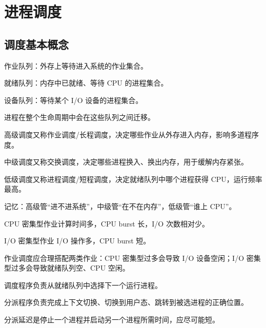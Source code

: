 \chapter{进程调度}

\section{调度基本概念}
\begin{points}
  \item 作业队列：外存上等待进入系统的作业集合。
  \item 就绪队列：内存中已就绪、等待 CPU 的进程集合。
  \item 设备队列：等待某个 I/O 设备的进程集合。
  \item 进程在整个生命周期中会在这些队列之间迁移。
\end{points}


\begin{points}
  \item 高级调度又称作业调度/长程调度，决定哪些作业从外存进入内存，影响多道程序度。
  \item 中级调度又称交换调度，决定哪些进程换入、换出内存，用于缓解内存紧张。
  \item 低级调度又称进程调度/短程调度，决定就绪队列中哪个进程获得 CPU，运行频率最高。
  \item 记忆：高级管“进不进系统”，中级管“在不在内存”，低级管“谁上 CPU”。
\end{points}


\begin{points}
  \item CPU 密集型作业计算时间多，CPU burst 长，I/O 次数相对少。
  \item I/O 密集型作业 I/O 操作多，CPU burst 短。
  \item 作业调度应合理搭配两类作业：CPU 密集型过多会导致 I/O 设备空闲；I/O 密集型过多会导致就绪队列空、CPU 空闲。
\end{points}


\begin{points}
  \item 调度程序负责从就绪队列中选择下一个运行进程。
  \item 分派程序负责完成上下文切换、切换到用户态、跳转到被选进程的正确位置。
  \item 分派延迟是停止一个进程并启动另一个进程所需时间，应尽可能短。
\end{points}


